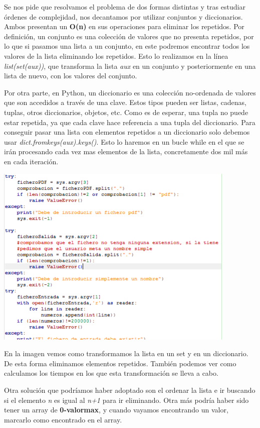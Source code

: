 \documentclass{article}
\begin{document}
Se nos pide que resolvamos el problema de dos formas distintas y tras estudiar órdenes de complejidad, nos decantamos por utilizar conjuntos y diccionarios. Ambos presentan un \textbf{O(n)} en sus operaciones para eliminar los repetidos. Por definición, un conjunto es una colección de valores que no presenta repetidos, por lo que si pasamos una lista a un conjunto, en este podremos encontrar todos los valores de la lista eliminando los repetidos. Esto lo realizamos en la línea \textit{list(set(aux))}, que transforma la lista \textit{aux} en un conjunto y posteriormente en una lista de nuevo, con los valores del conjunto. 

Por otra parte, en Python, un diccionario es una colección no-ordenada de valores que son accedidos a través de una clave. Estos tipos pueden ser listas, cadenas, tuplas, otros diccionarios, objetos, etc. Como es de esperar, una tupla no puede estar repetida, ya que cada clave hace referencia a una tupla del diccionario. Para conseguir pasar una lista con elementos repetidos a un diccionario solo debemos usar \textit{dict.fromkeys(aux).keys()}. Esto lo haremos en un bucle while en el que se irán procesando cada vez mas elementos de la lista, concretamente dos mil más en cada iteración.

\includegraphics[width=11.5cm]{Tratamiento_Errores.PNG}

En la imagen vemos como transformamos la lista en un set y en un diccionario. De esta forma eliminamos elementos repetidos. También podemos ver como calculamos los tiempos en los que esta transformación se lleva a cabo.

Otra solución que podríamos haber adoptado son el ordenar la lista e ir buscando si el elemento \textit{n} es igual al \textit{n+1} para ir eliminando. Otra más podría haber sido tener un array de \textbf{0-valormax}, y cuando vayamos encontrando un valor, marcarlo como encontrado en el array.
\end{document}
